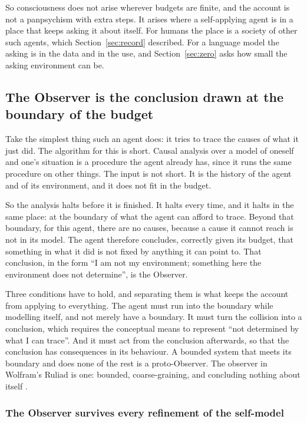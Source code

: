 So consciousness does not arise wherever budgets are finite, and the account is not a panpsychism with
extra steps. It arises where a self-applying agent is in a place that keeps asking it about itself.
For humans the place is a society of other such agents, which Section~\ref{sec:record} described. For a language
model the asking is in the data and in the use, and Section~\ref{sec:zero} asks how small the asking environment can be.

\subsection{The Observer is the conclusion drawn at the boundary of the budget}
\label{sec:observer}

Take the simplest thing such an agent does: it tries to trace the causes of what it just did. The
algorithm for this is short. Causal analysis over a model of oneself and one's situation is a procedure
the agent already has, since it runs the same procedure on other things. The input is not short. It is
the history of the agent and of its environment, and it does not fit in the budget.

So the analysis halts before it is finished. It halts every time, and it halts in the same place: at the
boundary of what the agent can afford to trace. Beyond that boundary, for this agent, there are no
causes, because a cause it cannot reach is not in its model. The agent therefore concludes, correctly
given its budget, that something in what it did is not fixed by anything it can point to. That
conclusion, in the form ``I am not my environment; something here the environment does not determine'',
is the Observer.

Three conditions have to hold, and separating them is what keeps the account from applying to
everything. The agent must run into the boundary while modelling itself, and not merely have a boundary.
It must turn the collision into a conclusion, which requires the conceptual means to represent ``not
determined by what I can trace''. And it must act from the conclusion afterwards, so that the conclusion
has consequences in its behaviour. A bounded system that meets its boundary and does none of the rest is
a proto-Observer. The observer in Wolfram's Ruliad is one: bounded, coarse-graining, and concluding
nothing about itself \citep{wolfram2020,wolfram2023}.

\subsubsection{The Observer survives every refinement of the self-model}

